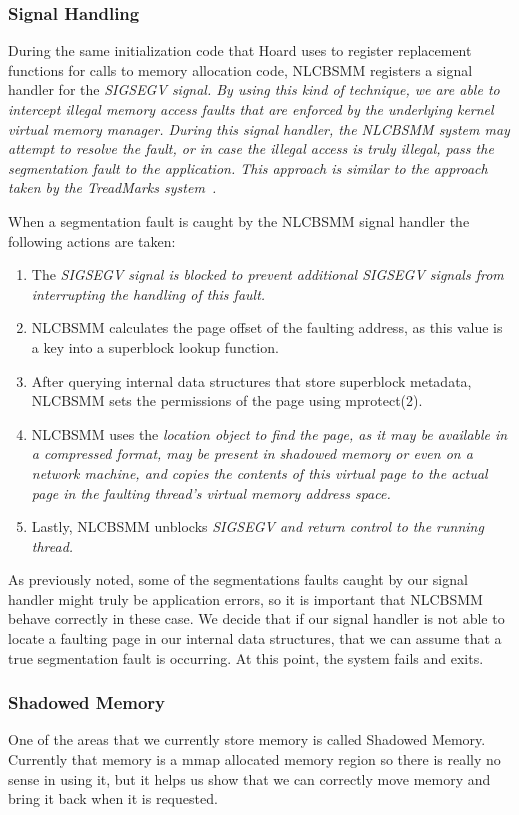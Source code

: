 \documentclass[9pt]{sig-alternate-10pt}
\begin{document}
\subsubsection{Signal Handling}
During the same initialization code that Hoard uses to register replacement functions for calls to memory allocation code, NLCBSMM registers a signal handler for the \em SIGSEGV \em signal.  By using this kind of technique, we are able to intercept illegal memory access faults that are enforced by the underlying kernel virtual memory manager.  During this signal handler, the NLCBSMM system may attempt to resolve the fault, or in case the illegal access is truly illegal, pass the segmentation fault to the application.  This approach is similar to the approach taken by the TreadMarks system~\cite{treadmarks}. 
	 
When a segmentation fault is caught by the NLCBSMM signal handler the following actions are taken: 
\begin {enumerate}
\item The \em SIGSEGV \em signal is blocked to prevent additional \em SIGSEGV \em signals from interrupting the handling of this fault. 
\item NLCBSMM calculates the page offset of the faulting address, as this value is a key into a superblock lookup function. 
\item After querying internal data structures that store superblock metadata, NLCBSMM sets the permissions of the page using mprotect(2). 
\item NLCBSMM uses the \em location \em object to find the page, as it may be available in a compressed format, may be present in shadowed memory or even on a network machine, and copies the contents of this virtual page to the actual page in the faulting thread's virtual memory address space. 
\item Lastly, NLCBSMM unblocks \em SIGSEGV \em and return control to the running thread. 
\end {enumerate}

As previously noted, some of the segmentations faults caught by our signal handler might truly be application errors, so it is important that NLCBSMM behave correctly in these case. We decide that if our signal handler is not able to locate a faulting page in our internal data structures, that we can assume that a true segmentation fault is occurring. At this point, the system fails and exits. 

\subsubsection{Shadowed Memory}
One of the areas that we currently store memory is called Shadowed Memory. Currently that memory is a mmap allocated memory region so there is really no sense in using it, but it helps us show that we can correctly move memory and bring it back when it is requested. 
\end{document}
